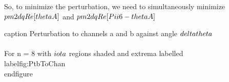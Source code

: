 So, to minimize the perturbation, we need to simultaneously minimize $\\pm 2 \\dqRe[ \\thetaA ]  $ and $\\pm 2 \\dqRe[ \\Pii{6} -\\thetaA]$

caption{ Perturbation to channels a and b against angle $\\delta \\theta$ \\\\
    For n = 8  with $\\iota$ regions shaded and extrema labelled }  \\label{fig:PtbToChan}
\\end{figure}

